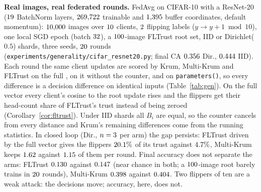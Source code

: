 \documentclass[journal]{IEEEtran}
\begin{document}
\textbf{Real images, real federated rounds.} FedAvg on CIFAR-10 with a ResNet-20
($19$ BatchNorm layers, $269{,}722$ trainable and $1{,}395$ buffer coordinates,
default momentum): $10{,}000$ images over $10$ clients, $2$ flipping
labels ($y\to y+1 \bmod 10$), one local SGD epoch (batch $32$), a
$100$-image FLTrust root set, IID or Dirichlet($0.5$) shards, three seeds,
$20$ rounds (\texttt{experiments/generality/cifar\_resnet20.py}; final CA
$0.356$ Dir., $0.444$ IID). Each round the same client updates
are scored by Krum, Multi-Krum and FLTrust on the full \sd{}, on it without the
counter, and on \texttt{parameters()}, so every difference is a decision
difference on identical inputs (Table~\ref{tab:gen}). On the full vector every
client's cosine to the root update rises and the flippers get their head-count
share of FLTrust's trust instead of being zeroed (Corollary~\ref{cor:fltrust}).
Under IID shards all $B_i$ are equal, so the counter cancels from every distance
and Krum's remaining differences come from the running statistics. In closed loop
(Dir., $n=3$ per arm) the gap persists: FLTrust driven by the full vector gives
the flippers $20.1\%$ of its trust against $4.7\%$, Multi-Krum
keeps $1.62$ against $1.15$ of them per round. Final accuracy does
not separate the arms: FLTrust $0.130$ against $0.147$ (near chance in
both; a $100$-image root barely trains in $20$ rounds), Multi-Krum
$0.398$ against $0.404$. Two flippers of ten are a weak attack: the
decisions move; accuracy, here, does not.
\end{document}
